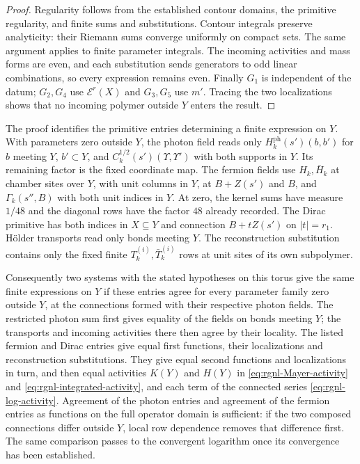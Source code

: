 \documentclass[11pt,letterpaper,reqno]{amsart}
\begin{document}
\begin{proof}
Regularity follows from the established contour domains,
the primitive regularity, and finite sums and substitutions.
Contour integrals preserve analyticity: their Riemann sums
converge uniformly on compact sets. The same argument
applies to finite parameter integrals. The incoming
activities and mass forms are even, and each substitution
sends generators to odd linear combinations, so every
expression remains even.
Finally $G_1$ is independent of the datum; $G_2,G_4$
use $\mathscr E^r(X)$ and $G_3,G_5$ use $m'$.
Tracing the two localizations shows that no incoming
polymer outside $Y$ enters the result.
\end{proof}

The proof identifies the primitive entries determining a
finite expression on $Y$. With parameters zero outside $Y$,
the photon field reads only
$H_k^{\mathrm{ph}}(s')(b,b')$ for $b$ meeting $Y$,
$b'\subset Y$, and
$C_k^{1/2}(s')(\Upsilon,\Upsilon')$ with both supports
in $Y$. Its remaining factor is the fixed coordinate map.
The fermion fields use $H_k,\bar H_k$ at chamber sites
over $Y$, with unit columns in $Y$, at $B+Z(s')$ and
$B$, and $\Gamma_k(s'',B)$ with both unit indices in $Y$.
At zero, the kernel sums have measure $1/48$ and the
diagonal rows have the factor $48$ already recorded.
The Dirac primitive has both indices in $X\subseteq Y$
and connection $B+tZ(s')$ on $|t|=r_1$.
H\"older transports read only bonds meeting $Y$.
The reconstruction substitution contains only the fixed
finite $T_k^{(i)},\bar T_k^{(i)}$ rows at unit sites of its
own subpolymer.

Consequently two systems with the stated hypotheses on this torus give the
same finite expressions on $Y$ if these entries agree
for every parameter family zero outside $Y$, at the
connections formed with their respective photon fields.
The restricted photon sum first gives equality of the
fields on bonds meeting $Y$; the transports and incoming
activities there then agree by their locality.
The listed fermion and Dirac entries give equal first
functions, their localizations and reconstruction
substitutions. They give equal second functions and
localizations in turn, and then equal activities $K(Y)$ and
$H(Y)$ in \eqref{eq:rgnl-Mayer-activity} and
\eqref{eq:rgnl-integrated-activity}, and each term of the
connected series \eqref{eq:rgnl-log-activity}.
Agreement of the photon
entries and agreement of the fermion entries as functions
on the full operator domain is sufficient: if the two
composed connections differ outside $Y$, local row
dependence removes that difference first.
The same comparison passes to the convergent logarithm
once its convergence has been established.
\end{document}
